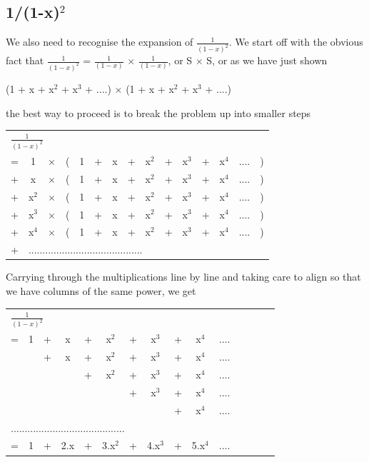 \documentclass[12pt,fleqn]{report}
\begin{document}
\subsection{1/(1-x)$^2$}

We also need to recognise the expansion of $\frac{1}{(1-x)^2}$.
We start off with the obvious fact that $\frac{1}{(1-x)^2}$
= $\frac{1}{(1-x)}$ $\times$ $\frac{1}{(1-x)}$, or S $\times$ S,
or as we have just shown 

\begin{center}
(1 + x + x$^2$ + x$^3$ + ....) $\times$ (1 + x + x$^2$ + x$^3$ + ....)
\end{center}

\noindent
the best way to proceed is to break the problem up into smaller steps


\begin{tabular}{r cc cc cc cc cc cc cc}
\multicolumn{10}{l}{$\frac{1}{(1-x)^2}$} \\
=  & 1 & $\times$ &(& 1 & + & x & + & x$^2$ & + & x$^3$ & + & x$^4$ &
  .... &)\\
+  & x & $\times$ &(& 1 & + & x & + & x$^2$ & + & x$^3$ & + & x$^4$ &
  .... &)\\
+  & x$^2$ & $\times$ &(& 1 & + & x & + & x$^2$ & + & x$^3$ & + &
  x$^4$ & .... &)\\
+  & x$^3$ & $\times$ &(& 1 & + & x & + & x$^2$ & + & x$^3$ & + & x$^4$ & .... &)\\
+  & x$^4$ & $\times$ &(& 1 & + & x & + & x$^2$ & + & x$^3$ & + &
  x$^4$ & .... &)\\
+ & \multicolumn{10}{l}{.........................................}\\
\end{tabular}

\noindent
Carrying through the multiplications line by line and taking care to
align so that we have columns of the same power, we get 

\begin{tabular}{r cc cc cc cc cc cc cc}
\multicolumn{10}{l}{$\frac{1}{(1-x)^2}$} \\
=  & 1 & + & x & + & x$^2$ & + & x$^3$ & + & x$^4$ &  .... &\\
   &   & + & x & + & x$^2$ & + & x$^3$ & + & x$^4$ &  .... &\\
   &   &   &   & + & x$^2$ & + & x$^3$ & + & x$^4$ &  .... &\\
   &   &   &   &   &       & + & x$^3$ & + & x$^4$ &  .... &\\
   &   &   &   &   &       &   &       & + & x$^4$ &  .... &\\
\multicolumn{10}{l}{.........................................}\\
\hline
= &  1 & + & 2.x & + & 3.x$^2$ & + & 4.x$^3$ & + & 5.x$^4$ &  .... &\\
\hline
\end{tabular}
\end{document}

